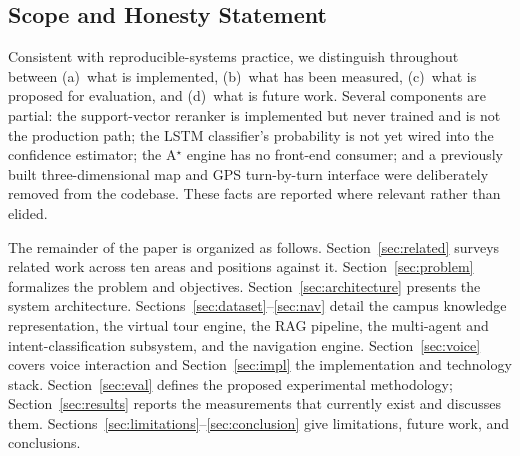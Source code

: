 \subsection{Scope and Honesty Statement}
Consistent with reproducible-systems practice, we distinguish throughout
between (a)~what is implemented, (b)~what has been measured, (c)~what is
proposed for evaluation, and (d)~what is future work. Several components are
partial: the support-vector reranker is implemented but never trained and
is not the production path; the LSTM classifier's probability is not yet
wired into the confidence estimator; the A$^{\star}$ engine has no
front-end consumer; and a previously built three-dimensional map and
GPS turn-by-turn interface were deliberately removed from the codebase.
These facts are reported where relevant rather than elided.

The remainder of the paper is organized as follows.
Section~\ref{sec:related} surveys related work across ten areas and
positions \system{} against it. Section~\ref{sec:problem} formalizes the
problem and objectives. Section~\ref{sec:architecture} presents the system
architecture. Sections~\ref{sec:dataset}--\ref{sec:nav} detail the campus
knowledge representation, the virtual tour engine, the RAG pipeline, the
multi-agent and intent-classification subsystem, and the navigation engine.
Section~\ref{sec:voice} covers voice interaction and
Section~\ref{sec:impl} the implementation and technology stack.
Section~\ref{sec:eval} defines the proposed experimental methodology;
Section~\ref{sec:results} reports the measurements that currently exist and
discusses them. Sections~\ref{sec:limitations}--\ref{sec:conclusion} give
limitations, future work, and conclusions.
